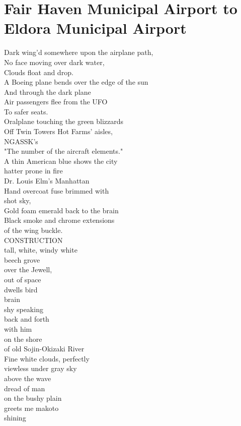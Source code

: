 \documentclass[smalldemyvopaper,11pt,twoside,onecolumn,openright,extrafontsizes]{memoir}
\newlength\drop
\begin{document}
\chapter{Fair Haven Municipal Airport to Eldora Municipal Airport}
Dark wing'd somewhere upon the airplane path,
\\No face moving over dark water,
\\Clouds float and drop.
\\A Boeing plane bends over the edge of the sun
\\And through the dark plane
\\Air passengers flee from the UFO
\\To safer seats.
\\Oralplane touching the green blizzards
\\Off Twin Towers Hot Farms' aisles,
\\NGASSK's
\\"The number of the aircraft elements."
\\A thin American blue shows the city
\\hatter prone in fire
\\Dr. Louis Elm's Manhattan
\\Hand overcoat fuse brimmed with
\\shot sky,
\\Gold foam emerald back to the brain
\\Black smoke and chrome extensions
\\of the wing buckle.
\\CONSTRUCTION
\\tall, white, windy white
\\beech grove
\\over the Jewell,
\\out of space
\\dwells bird
\\brain
\\shy speaking
\\back and forth
\\with him
\\on the shore
\\of old Sojin-Okizaki River
\\Fine white clouds, perfectly
\\viewless under gray sky
\\above the wave
\\dread of man
\\on the bushy plain
\\greets me makoto
\\shining
\end{document}
